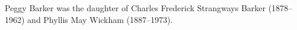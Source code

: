 
Peggy Barker was the daughter of Charles Frederick Strangways Barker (1878--1962) and Phyllis May Wickham (1887--1973).
